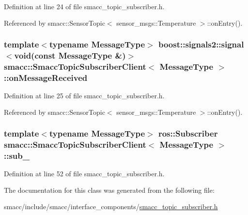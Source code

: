 Definition at line 24 of file smacc\+\_\+topic\+\_\+subscriber.\+h.



Referenced by smacc\+::\+Sensor\+Topic$<$ sensor\+\_\+msgs\+::\+Temperature $>$\+::on\+Entry().

\subsubsection[{\texorpdfstring{on\+Message\+Received}{onMessageReceived}}]{\setlength{\rightskip}{0pt plus 5cm}template$<$typename Message\+Type$>$ boost\+::signals2\+::signal$<$void(const Message\+Type \&)$>$ {\bf smacc\+::\+Smacc\+Topic\+Subscriber\+Client}$<$ Message\+Type $>$\+::on\+Message\+Received}\hypertarget{classsmacc_1_1SmaccTopicSubscriberClient_a4260d955152200804e9c51a1098965c8}{}\label{classsmacc_1_1SmaccTopicSubscriberClient_a4260d955152200804e9c51a1098965c8}


Definition at line 25 of file smacc\+\_\+topic\+\_\+subscriber.\+h.



Referenced by smacc\+::\+Sensor\+Topic$<$ sensor\+\_\+msgs\+::\+Temperature $>$\+::on\+Entry().

\subsubsection[{\texorpdfstring{sub\+\_\+}{sub_}}]{\setlength{\rightskip}{0pt plus 5cm}template$<$typename Message\+Type$>$ ros\+::\+Subscriber {\bf smacc\+::\+Smacc\+Topic\+Subscriber\+Client}$<$ Message\+Type $>$\+::sub\+\_\+\hspace{0.3cm}{\ttfamily [private]}}\hypertarget{classsmacc_1_1SmaccTopicSubscriberClient_aeb481004e428a5d989f39c77321427b6}{}\label{classsmacc_1_1SmaccTopicSubscriberClient_aeb481004e428a5d989f39c77321427b6}


Definition at line 52 of file smacc\+\_\+topic\+\_\+subscriber.\+h.



The documentation for this class was generated from the following file\+:\begin{DoxyCompactItemize}
\item 
smacc/include/smacc/interface\+\_\+components/\hyperlink{smacc__topic__subscriber_8h}{smacc\+\_\+topic\+\_\+subscriber.\+h}\end{DoxyCompactItemize}
